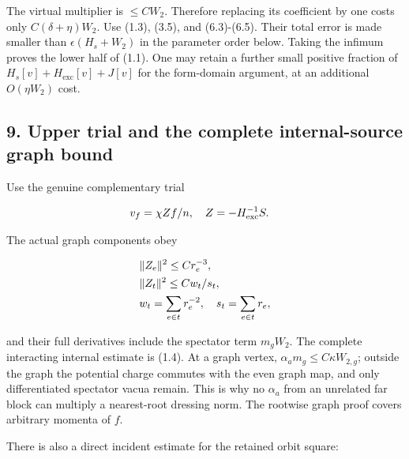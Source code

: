 The virtual multiplier is \(\le CW_{2}\). Therefore replacing its
coefficient by one costs only \(C(\delta +\eta )W_{2}\). Use (1.3),
(3.5), and (6.3)-(6.5). Their total error is made smaller than
\(\epsilon (H_{s}+W_{2})\) in the parameter order below. Taking the
infimum proves the lower half of (1.1). One may retain a further small
positive fraction of \(H_{s}[v]+H_{\mathrm{exc}}[v]+J[v]\) for the
form-domain argument, at an additional \(O(\eta  W_{2})\) cost.

\subsection{9. Upper trial and the complete internal-source graph
bound}\label{i-upper-trial-and-the-complete-internal-source-graph-bound}

Use the genuine complementary trial

\begin{gather*}
\begin{aligned}
& v_{f}=\chi  Zf/n, \quad  Z=-H_{\mathrm{exc}}^{-1}S.
\end{aligned}\notag
\end{gather*}

The actual graph components obey

\begin{gather*}
\begin{aligned}
& \Vert Z_{e}\Vert ^{2}\le C r_{e}^{-3}, \\
& \Vert Z_{t}\Vert ^{2}\le C w_{t}/s_{t}, \\
& w_{t}=\sum _{e \in  t}r_{e}^{-2}, \quad  s_{t}=\sum _{e \in  t}r_{e},
\end{aligned}\notag
\end{gather*}

and their full derivatives include the spectator term \(m_{g}W_{2}\).
The complete interacting internal estimate is (1.4). At a graph vertex,
\(\alpha _{a} m_{g}\le C \kappa  W_{2,g}\); outside the graph the
potential charge commutes with the even graph map, and only
differentiated spectator vacua remain. This is why no \(\alpha _{a}\)
from an unrelated far block can multiply a nearest-root dressing norm.
The rootwise graph proof covers arbitrary momenta of \(f\).

There is also a direct incident estimate for the retained orbit square:

